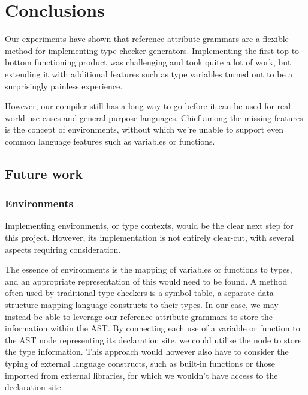 \documentclass[nofilelist]{cslthse-msc}
\begin{document}
\chapter{Conclusions} %
Our experiments have shown that reference attribute grammars are a flexible method for implementing type checker generators.
Implementing the first top-to-bottom functioning product was challenging and took quite a lot of work, but extending it with additional features such as type variables turned out to be a surprisingly painless experience.

However, our compiler still has a long way to go before it can be used for real world use cases and general purpose languages.
Chief among the missing features is the concept of environments, without which we're unable to support even common language features such as variables or functions.

\section{Future work}
\subsection{Environments}
Implementing environments, or type contexts, would be the clear next step for this project.
However, its implementation is not entirely clear-cut, with several aspects requiring consideration.

The essence of environments is the mapping of variables or functions to types, and an appropriate representation of this would need to be found.
A method often used by traditional type checkers is a symbol table, a separate data structure mapping language constructs to their types.
In our case, we may instead be able to leverage our reference attribute grammars to store the information within the AST.
By connecting each use of a variable or function to the AST node representing its declaration site, we could utilise the node to store the type information.
This approach would however also have to consider the typing of external language constructs, such as built-in functions or those imported from external libraries, for which we wouldn't have access to the declaration site.
\end{document}
